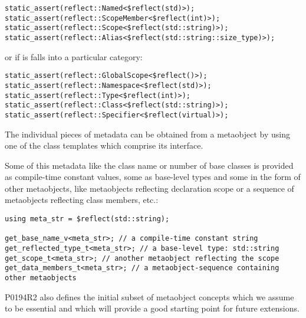 \begin{verbatim}
static_assert(reflect::Named<$reflect(std)>);
static_assert(reflect::ScopeMember<$reflect(int)>);
static_assert(reflect::Scope<$reflect(std::string)>);
static_assert(reflect::Alias<$reflect(std::string::size_type)>);
\end{verbatim}

or if is falls into a particular category:

\begin{verbatim}
static_assert(reflect::GlobalScope<$reflect()>);
static_assert(reflect::Namespace<$reflect(std)>);
static_assert(reflect::Type<$reflect(int)>);
static_assert(reflect::Class<$reflect(std::string)>);
static_assert(reflect::Specifier<$reflect(virtual)>);
\end{verbatim}

The individual pieces of metadata can be obtained from a metaobject by using one
of the class templates which comprise its interface.

Some of this metadata like the class name or number of base classes is provided
as compile-time constant values, some as base-level types
and some in the form of other metaobjects, like metaobjects
reflecting declaration scope or a sequence of metaobjects reflecting class members,
etc.:

\begin{verbatim}
using meta_str = $reflect(std::string);

get_base_name_v<meta_str>; // a compile-time constant string
get_reflected_type_t<meta_str>; // a base-level type: std::string
get_scope_t<meta_str>; // another metaobject reflecting the scope
get_data_members_t<meta_str>; // a metaobject-sequence containing other metaobjects
\end{verbatim}

P0194R2 also defines the initial subset
of metaobject concepts which we assume to be essential
and which will provide a good starting point for future extensions.

